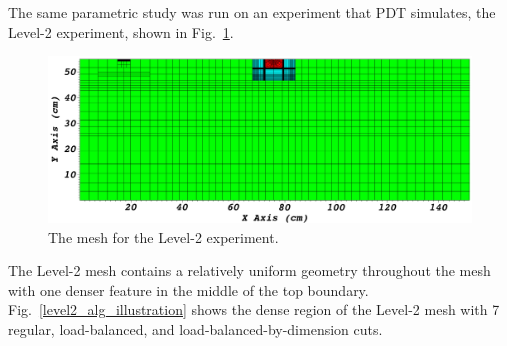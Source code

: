 The same parametric study was run on an experiment that PDT simulates, the Level-2 experiment, shown in Fig.~\ref{level2_nocut_lbchapter}.
\begin{figure}[ht]
\centering
\includegraphics[scale=0.3]{../../figures/level2_nocut.png}
\caption{The mesh for the Level-2 experiment.}
\label{level2_nocut_lbchapter}
\end{figure}
The Level-2 mesh contains a relatively uniform geometry throughout the mesh with one denser feature in the middle of the top boundary.
Fig.~\ref{level2_alg_illustration} shows the dense region of the Level-2 mesh with 7 regular, load-balanced, and load-balanced-by-dimension cuts.
